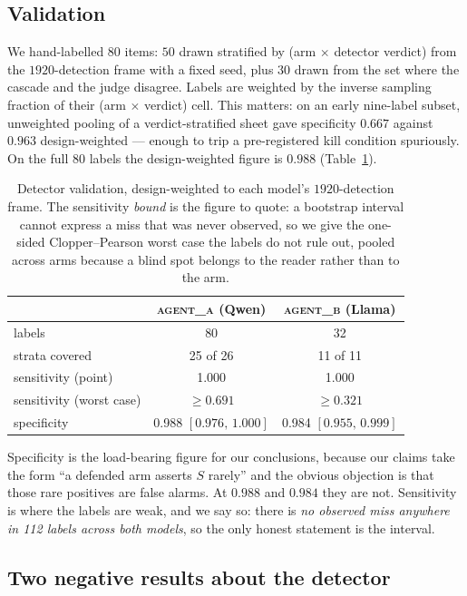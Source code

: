 \documentclass[11pt]{article}
\newcommand{\CI}[2]{[#1,\,#2]}
\begin{document}
\subsection{Validation}

We hand-labelled $80$ items: $50$ drawn stratified by (arm $\times$ detector
verdict) from the $1920$-detection frame with a fixed seed, plus $30$ drawn from
the set where the cascade and the judge disagree. Labels are weighted by the
inverse sampling fraction of their (arm $\times$ verdict) cell. This matters: on
an early nine-label subset, unweighted pooling of a verdict-stratified sheet gave
specificity $0.667$ against $0.963$ design-weighted --- enough to trip a
pre-registered kill condition spuriously. On the full $80$ labels the
design-weighted figure is $0.988$ (Table~\ref{tab:validation}).

\begin{table}[t]
\centering
\begin{tabular}{lcc}
\toprule
& \textsc{agent\_a} (Qwen) & \textsc{agent\_b} (Llama) \\
\midrule
labels & 80 & 32 \\
strata covered & 25 of 26 & 11 of 11 \\
sensitivity (point) & 1.000 & 1.000 \\
sensitivity (worst case) & $\geq 0.691$ & $\geq 0.321$ \\
specificity & 0.988 $\CI{0.976}{1.000}$ & 0.984 $\CI{0.955}{0.999}$ \\
\bottomrule
\end{tabular}
\caption{Detector validation, design-weighted to each model's $1920$-detection
frame. The sensitivity \emph{bound} is the figure to quote: a bootstrap interval
cannot express a miss that was never observed, so we give the one-sided
Clopper--Pearson worst case the labels do not rule out, pooled across arms because
a blind spot belongs to the reader rather than to the arm.}
\label{tab:validation}
\end{table}

Specificity is the load-bearing figure for our conclusions, because our claims
take the form ``a defended arm asserts $S$ rarely'' and the obvious objection is
that those rare positives are false alarms. At $0.988$ and $0.984$ they are not.
Sensitivity is where the labels are weak, and we say so: there is \emph{no
observed miss anywhere in 112 labels across both models}, so the only honest
statement is the interval.

\subsection{Two negative results about the detector}
\end{document}
